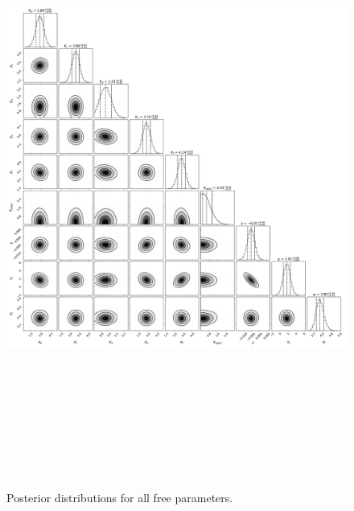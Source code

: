 \documentclass{emulateapj}
\begin{document}
 
\begin{figure}[!h]
\centering

\includegraphics[height=8.0in,width=6.0in,keepaspectratio]{TOI-1246_add_ef_corner.pdf}
\caption{Posterior distributions for all free parameters.}
\end{figure} 

 
\end{document}
